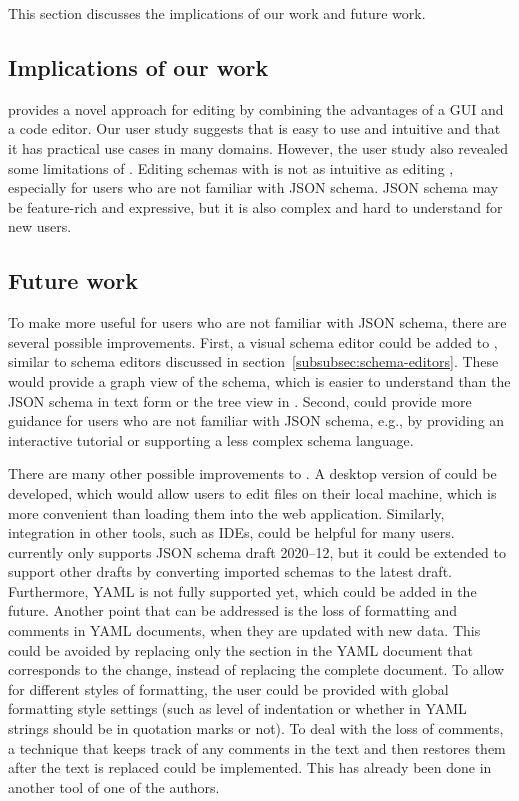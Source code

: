 This section discusses the implications of our work and future work.


\subsection{Implications of our work}\label{subsec:implications-of-our-work}

\toolname{} provides a novel approach for editing \cfgfiles{}
by combining the advantages of a GUI and a code editor.
Our user study suggests that \toolname{} is easy to use and intuitive and
that it has practical use cases in many domains.
However, the user study also revealed some limitations of \toolname{}.
Editing schemas with \toolname{} is not as intuitive as editing \cfgfiles{},
especially for users who are not familiar with JSON schema.
JSON schema may be feature-rich and expressive, but it is also complex and
hard to understand for new users.

\subsection{Future work}\label{subsec:future-work}
To make \toolname{} more useful for users who are not familiar with JSON schema,
there are several possible improvements.
First, a visual schema editor could be added to \toolname{}, similar to schema editors
discussed in section~\ref{subsubsec:schema-editors}.
These would provide a graph view of the schema, which is easier to understand than
the JSON schema in text form or the tree view in \toolname{}.
Second, \toolname{} could provide more guidance for users who are not familiar with JSON schema,
e.g., by providing an interactive tutorial or supporting a less complex schema language.

There are many other possible improvements to \toolname{}.
A desktop version of \toolname{} could be developed, which would allow users to
edit files on their local machine, which is more convenient than loading them into the web application.
Similarly, integration in other tools, such as IDEs, could be helpful for many users.
\toolname{} currently only supports JSON schema draft 2020--12, but it could be extended to support
other drafts by converting imported schemas to the latest draft.
Furthermore, YAML is not fully supported yet, which could be added in the future.
Another point that can be addressed is the loss of formatting and comments in YAML documents, when they are updated with new data.
This could be avoided by replacing only the section in the YAML document that corresponds to the change, instead of replacing the complete document.
To allow for different styles of formatting, the user could be provided with global formatting style settings (such as level of indentation or whether in YAML strings should be in quotation marks or not).
To deal with the loss of comments, a technique that keeps track of any comments in the text and then restores them after the text is replaced could be implemented. This has already been done in another tool of one of the authors\cite{githubBspEditor}.

